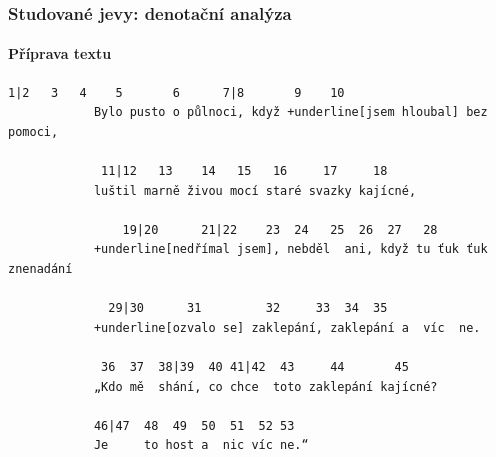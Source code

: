 \documentclass[12pt]{beamer}
\begin{document}
\begin{frame}[fragile]
	\frametitle{Studované jevy: denotační analýza}
	\framesubtitle{Příprava textu}


	\begin{footnotesize}
		\begin{Verbatim}[commandchars=+\[\]]
			 1|2   3   4    5       6      7|8       9    10
			Bylo pusto o půlnoci, když +underline[jsem hloubal] bez pomoci,
			
			 11|12   13    14   15   16     17     18
			luštil marně živou mocí staré svazky kajícné,
			
			    19|20      21|22    23  24   25  26  27   28
			+underline[nedřímal jsem], nebděl  ani, když tu ťuk ťuk znenadání
			
			  29|30      31         32     33  34  35
			+underline[ozvalo se] zaklepání, zaklepání a  víc  ne.
			
			 36  37  38|39  40 41|42  43     44       45
			„Kdo mě  shání, co chce  toto zaklepání kajícné?
			
			46|47  48  49  50  51  52 53
			Je     to host a  nic víc ne.“
		\end{Verbatim}	
	\end{footnotesize}

\end{frame}
\end{document}
